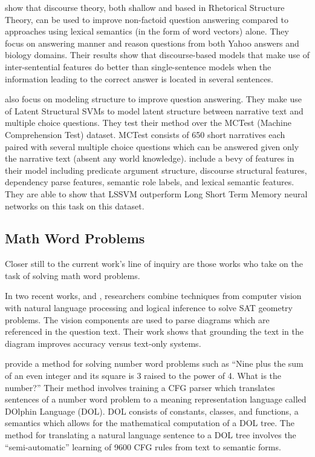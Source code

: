  show that discourse theory, both shallow and based in Rhetorical Structure Theory, can be used to improve non-factoid question answering compared to approaches using lexical semantics (in the form of word vectors) alone. 
They focus on answering manner and reason questions from both Yahoo answers and biology domains. 
Their results show that discourse-based models that make use of inter-sentential features do better than single-sentence models when the information leading to the correct answer is located in several sentences. 

 also focus on modeling structure to improve question answering. 
They make use of Latent Structural SVMs to model latent structure between narrative text and multiple choice questions.
They test their method over the MCTest (Machine Comprehension Test) dataset. 
MCTest consists of 650 short narratives each paired with several multiple choice questions which can be answered given only the narrative text (absent any world knowledge). 
 include a bevy of features in their model including predicate argument structure, discourse structural features, dependency parse features, semantic role labels, and lexical semantic features. 
They are able to show that LSSVM outperform Long Short Term Memory neural networks on this task on this dataset. 

\subsection{Math Word Problems}
Closer still to the current work's line of inquiry are those works who take on the task of solving math word problems.
 
In two recent works,  and , researchers combine techniques from computer vision with natural language processing and logical inference to solve SAT geometry problems. The vision components are used to parse diagrams which are referenced in the question text. Their work shows that grounding the text in the diagram improves accuracy versus text-only systems.

 provide a method for solving number word problems such as ``Nine plus the sum of an even integer and its square is 3 raised to the power of 4. What is the number?''  Their method involves training a CFG parser which translates sentences of a number word problem to a meaning representation language called DOlphin Language (DOL). DOL consists of constants, classes, and functions, a semantics which allows for the mathematical computation of a DOL tree. The method for translating a natural language sentence to a DOL tree involves the ``semi-automatic'' learning of 9600 CFG rules from text to semantic forms. 

